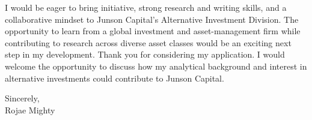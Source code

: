 \documentclass[10pt,letterpaper]{article}
\begin{document}
I would be eager to bring initiative, strong research and writing skills, and a collaborative mindset to Junson Capital's Alternative Investment Division. The opportunity to learn from a global investment and asset-management firm while contributing to research across diverse asset classes would be an exciting next step in my development. Thank you for considering my application. I would welcome the opportunity to discuss how my analytical background and interest in alternative investments could contribute to Junson Capital.

\vspace{4pt}
Sincerely,\\[12pt]
Rojae Mighty
\end{document}
